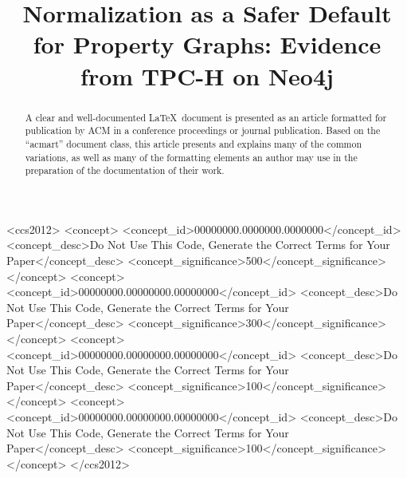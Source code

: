 \documentclass[sigconf]{acmart}
\begin{document}
\title{Normalization as a Safer Default for Property Graphs:
Evidence from TPC-H on Neo4j}

\renewcommand{\shortauthors}{Trovato et al.}

\begin{abstract}
  A clear and well-documented \LaTeX\ document is presented as an
  article formatted for publication by ACM in a conference proceedings
  or journal publication. Based on the ``acmart'' document class, this
  article presents and explains many of the common variations, as well
  as many of the formatting elements an author may use in the
  preparation of the documentation of their work.
\end{abstract}

\begin{CCSXML}
<ccs2012>
 <concept>
  <concept_id>00000000.0000000.0000000</concept_id>
  <concept_desc>Do Not Use This Code, Generate the Correct Terms for Your Paper</concept_desc>
  <concept_significance>500</concept_significance>
 </concept>
 <concept>
  <concept_id>00000000.00000000.00000000</concept_id>
  <concept_desc>Do Not Use This Code, Generate the Correct Terms for Your Paper</concept_desc>
  <concept_significance>300</concept_significance>
 </concept>
 <concept>
  <concept_id>00000000.00000000.00000000</concept_id>
  <concept_desc>Do Not Use This Code, Generate the Correct Terms for Your Paper</concept_desc>
  <concept_significance>100</concept_significance>
 </concept>
 <concept>
  <concept_id>00000000.00000000.00000000</concept_id>
  <concept_desc>Do Not Use This Code, Generate the Correct Terms for Your Paper</concept_desc>
  <concept_significance>100</concept_significance>
 </concept>
</ccs2012>
\end{CCSXML}
\end{document}
